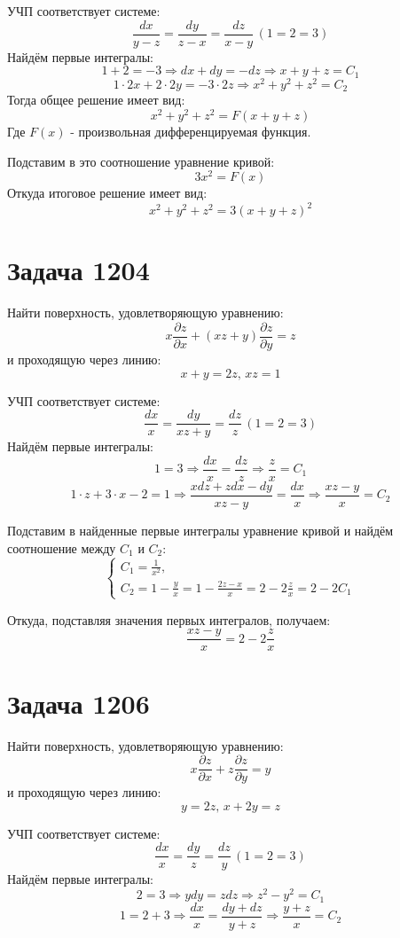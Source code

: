 \documentclass[11pt]{article}
\begin{document}
УЧП соответствует системе:
$$\frac{dx}{y - z} = \frac{dy}{z - x} = \frac{dz}{x - y}\, (1 = 2 = 3)$$
Найдём первые интегралы:
$$1 + 2 = -3 \Rightarrow dx + dy = -dz \Rightarrow x + y + z = C_1$$
$$1 \cdot 2x + 2 \cdot 2y = -3 \cdot 2z \Rightarrow x^2 + y^2 + z^2 = C_2$$
Тогда общее решение имеет вид:
$$x^2 + y^2 + z^2 = F(x + y + z)$$
Где \(F(x)\) - произвольная дифференцируемая функция.

Подставим в это соотношение уравнение кривой:
$$3x^2 = F(x)$$
Откуда итоговое решение имеет вид:
$$x^2 + y^2 + z^2 = 3(x + y + z)^2$$

\section{Задача 1204}
\label{sec:orgee57bbe}
Найти поверхность, удовлетворяющую уравнению:
$$x\frac{\partial{z}}{\partial{x}} + (xz + y)\frac{\partial{z}}{\partial{y}} = z$$
и проходящую через линию:
$$x + y = 2z,\, xz = 1$$

УЧП соответствует системе:
$$\frac{dx}{x} = \frac{dy}{xz + y} = \frac{dz}{z}\, (1 = 2 = 3)$$
Найдём первые интегралы:
$$1 = 3 \Rightarrow \frac{dx}{x} = \frac{dz}{z} \Rightarrow \frac{z}{x} = C_1$$
$$1 \cdot z + 3 \cdot x - 2 = 1 \Rightarrow \frac{xdz + zdx - dy}{xz - y} = \frac{dx}{x} \Rightarrow \frac{xz - y}{x} = C_2$$

Подставим в найденные первые интегралы уравнение кривой и найдём соотношение между \(C_1\) и \(C_2\):
\begin{equation*}
  \begin{cases}
    C_1 = \frac{1}{x^2},\\
    C_2 = 1 - \frac{y}{x} = 1 - \frac{2z - x}{x} = 2 - 2\frac{z}{x} = 2 - 2C_1
  \end{cases}
\end{equation*}

Откуда, подставляя значения первых интегралов, получаем:
$$\frac{xz - y}{x} = 2 - 2\frac{z}{x}$$

\section{Задача 1206}
\label{sec:org19745c8}
Найти поверхность, удовлетворяющую уравнению:
$$x\frac{\partial{z}}{\partial{x}} + z\frac{\partial{z}}{\partial{y}} = y$$
и проходящую через линию:
$$y = 2z,\, x + 2y = z$$

УЧП соответствует системе:
$$\frac{dx}{x} = \frac{dy}{z} = \frac{dz}{y}\, (1 = 2 = 3)$$
Найдём первые интегралы:
$$2 = 3 \Rightarrow ydy = zdz \Rightarrow z^2 - y^2 = C_1$$
$$1 = 2 + 3 \Rightarrow \frac{dx}{x} = \frac{dy + dz}{y + z} \Rightarrow \frac{y + z}{x} = C_2$$
\end{document}
